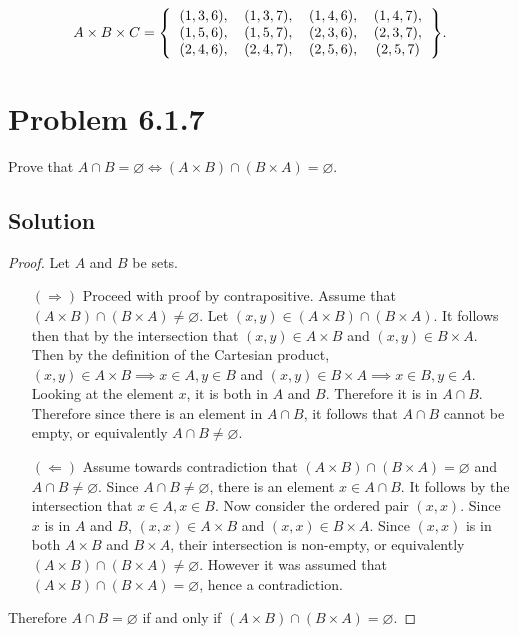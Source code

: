 \documentclass[12pt]{extarticle}
\begin{document}
\[
	A \times B \times C = \qty{
	\begin{tabular}{c c c c}
		$(1, 3, 6),$ &
		$(1, 3, 7),$ &
		$(1, 4, 6),$ &
		$(1, 4, 7),$ \\
		$(1, 5, 6),$ &
		$(1, 5, 7),$ &
		$(2, 3, 6),$ &
		$(2, 3, 7),$ \\
		$(2, 4, 6),$ &
		$(2, 4, 7),$ &
		$(2, 5, 6),$ &
		$(2, 5, 7)$
	\end{tabular}
}
.\]

\section*{Problem 6.1.7}

Prove that $A \cap B = \varnothing \Longleftrightarrow (A \times B) \cap (B \times A) = \varnothing$.

\subsection*{Solution}

\begin{proof}
	Let $A$ and $B$ be sets.
	\begin{enumerate}
		\item[$(\Rightarrow)$]
			Proceed with proof by contrapositive. Assume that $(A \times B) \cap (B \times A) \neq \varnothing$. Let $(x,y) \in (A \times B) \cap (B \times A)$. It follows then that by the intersection that $(x,y) \in A\times B$ and $(x,y) \in B \times A$. Then by the definition of the Cartesian product, $(x,y) \in A \times B \implies x \in A, y \in B$ and $(x,y) \in B \times A \implies x \in B, y\in A$. Looking at the element $x$, it is both in $A$ and $B$. Therefore it is in $A \cap B$. Therefore since there is an element in $A \cap B$, it follows that $A \cap B$ cannot be empty, or equivalently $A \cap B \neq \varnothing$.
		\item[$(\Leftarrow)$]
			Assume towards contradiction that $(A \times B) \cap (B \times A) = \varnothing$ and $A \cap B \neq \varnothing$. Since $A \cap B \neq \varnothing$, there is an element $x \in A\cap B$. It follows by the intersection that $x\in A, x\in B$. Now consider the ordered pair $(x,x)$. Since $x$ is in $A$ and $B$, $(x,x) \in A \times B$ and $(x,x) \in B \times A$. Since $(x,x)$ is in both $A \times B$ and $B \times A$, their intersection is non-empty, or equivalently $(A \times B) \cap (B \times A) \neq \varnothing$. However it was assumed that $(A \times B) \cap (B \times A) = \varnothing$, hence a contradiction.
	\end{enumerate}
	Therefore $A \cap B = \varnothing$ if and only if $(A \times B) \cap (B \times A) = \varnothing$.
\end{proof}
\end{document}
